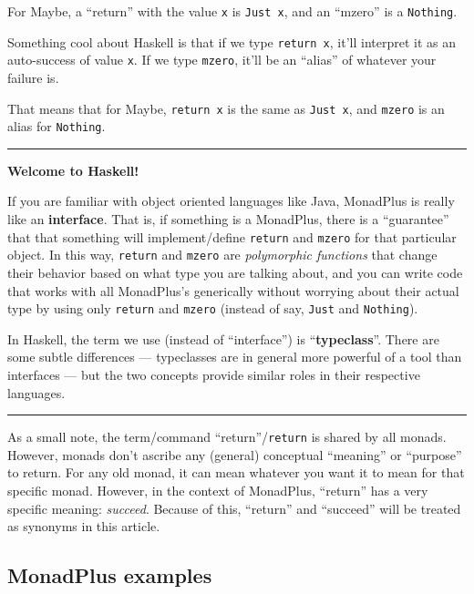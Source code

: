 \documentclass[]{article}
\begin{document}
For Maybe, a ``return'' with the value \texttt{x} is \texttt{Just\ x}, and an
``mzero'' is a \texttt{Nothing}.

Something cool about Haskell is that if we type \texttt{return\ x}, it'll
interpret it as an auto-success of value \texttt{x}. If we type \texttt{mzero},
it'll be an ``alias'' of whatever your failure is.

That means that for Maybe, \texttt{return\ x} is the same as \texttt{Just\ x},
and \texttt{mzero} is an alias for \texttt{Nothing}.

\begin{center}\rule{0.5\linewidth}{0.5pt}\end{center}

\textbf{Welcome to Haskell!}

If you are familiar with object oriented languages like Java, MonadPlus is
really like an \textbf{interface}. That is, if something is a MonadPlus, there
is a ``guarantee'' that that something will implement/define \texttt{return} and
\texttt{mzero} for that particular object. In this way, \texttt{return} and
\texttt{mzero} are \emph{polymorphic functions} that change their behavior based
on what type you are talking about, and you can write code that works with all
MonadPlus's generically without worrying about their actual type by using only
\texttt{return} and \texttt{mzero} (instead of say, \texttt{Just} and
\texttt{Nothing}).

In Haskell, the term we use (instead of ``interface'') is
``\textbf{typeclass}''. There are some subtle differences --- typeclasses are in
general more powerful of a tool than interfaces --- but the two concepts provide
similar roles in their respective languages.

\begin{center}\rule{0.5\linewidth}{0.5pt}\end{center}

As a small note, the term/command ``return''/\texttt{return} is shared by all
monads. However, monads don't ascribe any (general) conceptual ``meaning'' or
``purpose'' to return. For any old monad, it can mean whatever you want it to
mean for that specific monad. However, in the context of MonadPlus, ``return''
has a very specific meaning: \emph{succeed}. Because of this, ``return'' and
``succeed'' will be treated as synonyms in this article.

\subsection{MonadPlus examples}\label{monadplus-examples}
\end{document}
